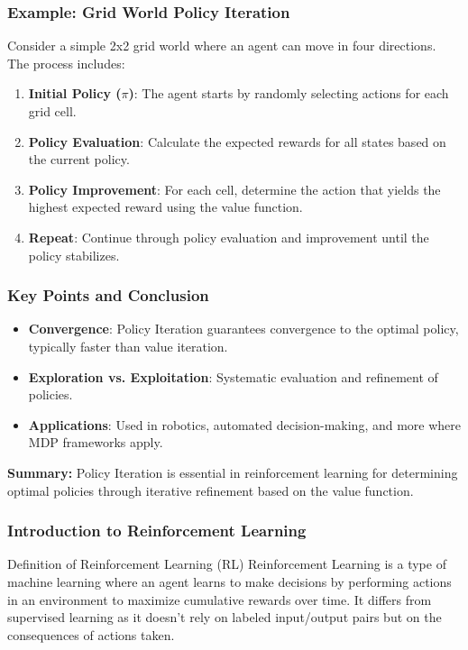 \documentclass[aspectratio=169]{beamer}
\begin{document}
\begin{frame}[fragile]
    \frametitle{Example: Grid World Policy Iteration}
    Consider a simple 2x2 grid world where an agent can move in four directions. The process includes:
    \begin{enumerate}
        \item \textbf{Initial Policy ($\pi$)}: The agent starts by randomly selecting actions for each grid cell.
        \item \textbf{Policy Evaluation}: Calculate the expected rewards for all states based on the current policy.
        \item \textbf{Policy Improvement}: For each cell, determine the action that yields the highest expected reward using the value function.
        \item \textbf{Repeat}: Continue through policy evaluation and improvement until the policy stabilizes.
    \end{enumerate}
\end{frame}

\begin{frame}[fragile]
    \frametitle{Key Points and Conclusion}
    \begin{itemize}
        \item \textbf{Convergence}: Policy Iteration guarantees convergence to the optimal policy, typically faster than value iteration.
        \item \textbf{Exploration vs. Exploitation}: Systematic evaluation and refinement of policies.
        \item \textbf{Applications}: Used in robotics, automated decision-making, and more where MDP frameworks apply.
    \end{itemize}

    \textbf{Summary:} Policy Iteration is essential in reinforcement learning for determining optimal policies through iterative refinement based on the value function.
\end{frame}

\begin{frame}[fragile]
    \frametitle{Introduction to Reinforcement Learning}

    \begin{block}{Definition of Reinforcement Learning (RL)}
        Reinforcement Learning is a type of machine learning where an agent learns to make decisions by performing actions in an environment to maximize cumulative rewards over time. It differs from supervised learning as it doesn’t rely on labeled input/output pairs but on the consequences of actions taken.
    \end{block}
\end{frame}
\end{document}

